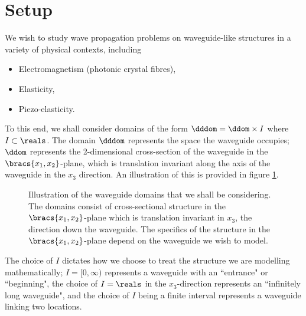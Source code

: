 \section{Setup} \label{sec:Setup}
We wish to study wave propagation problems on waveguide-like structures in a variety of physical contexts, including 
\begin{itemize}
	\item Electromagnetism (photonic crystal fibres),
	\item Elasticity,
	\item Piezo-elasticity.
\end{itemize}
To this end, we shall consider domains of the form $\dddom = \ddom\times I$ where $I\subset\reals$.
The domain $\dddom$ represents the space the waveguide occupies; $\ddom$ represents the 2-dimensional cross-section of the waveguide in the $\bracs{x_1,x_2}$-plane, which is translation invariant along the axis of the waveguide in the $x_3$ direction.
An illustration of this is provided in figure \ref{fig:IntroStrucDiagram}.
\begin{figure}[h!]
	\centering
	\caption{\label{fig:IntroStrucDiagram} Illustration of the waveguide domains that we shall be considering. The domains consist of cross-sectional structure in the $\bracs{x_1,x_2}$-plane which is translation invariant in $x_3$, the direction down the waveguide. The specifics of the structure in the $\bracs{x_1,x_2}$-plane depend on the waveguide we wish to model.}
\end{figure}
The choice of $I$ dictates how we choose to treat the structure we are modelling mathematically; $I=[0,\infty)$ represents a waveguide with an ``entrance" or ``beginning", the choice of $I=\reals$ in the $x_3$-direction represents an ``infinitely long waveguide", and the choice of $I$ being a finite interval represents a waveguide linking two locations. \newline
